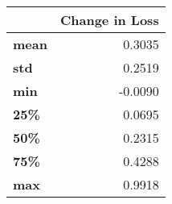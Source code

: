 \begin{tabular}{lr}
\toprule
{} &  Change in Loss \\
\midrule
\textbf{mean} &          0.3035 \\
\textbf{std } &          0.2519 \\
\textbf{min } &         -0.0090 \\
\textbf{25\% } &          0.0695 \\
\textbf{50\% } &          0.2315 \\
\textbf{75\% } &          0.4288 \\
\textbf{max } &          0.9918 \\
\bottomrule
\end{tabular}
